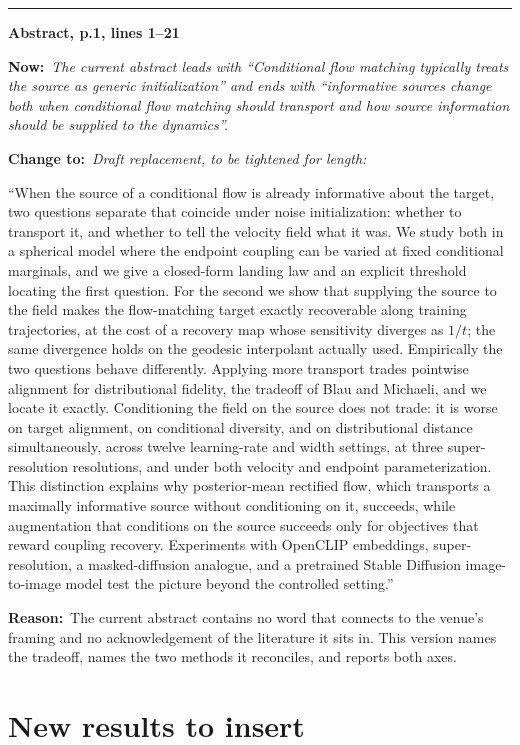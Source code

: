 \documentclass[11pt]{article}
\newcommand{\NEW}[1]{\medskip\noindent\textcolor{hd}{\rule{\textwidth}{0.6pt}}\par
  \noindent\textbf{#1}\par\smallskip}
\newcommand{\OLD}[1]{\noindent\textcolor{cut}{\textbf{Now:}}\ \begingroup\itshape #1\endgroup\par\smallskip}
\newcommand{\FIX}[1]{\noindent\textcolor{put}{\textbf{Change to:}}\ \begingroup\itshape #1\endgroup\par\smallskip}
\newcommand{\NOTE}[1]{\noindent\textbf{Reason:}\ #1\par}
\begin{document}
\NEW{Abstract, p.1, lines 1--21}
\OLD{The current abstract leads with ``Conditional flow matching typically treats the source as
generic initialization'' and ends with ``informative sources change both when conditional flow
matching should transport and how source information should be supplied to the dynamics''.}
\FIX{Draft replacement, to be tightened for length:

``When the source of a conditional flow is already informative about the target, two questions
separate that coincide under noise initialization: whether to transport it, and whether to tell
the velocity field what it was. We study both in a spherical model where the endpoint coupling
can be varied at fixed conditional marginals, and we give a closed-form landing law and an
explicit threshold locating the first question. For the second we show that supplying the source
to the field makes the flow-matching target exactly recoverable along training trajectories, at
the cost of a recovery map whose sensitivity diverges as $1/t$; the same divergence holds on the
geodesic interpolant actually used. Empirically the two questions behave differently. Applying
more transport trades pointwise alignment for distributional fidelity, the tradeoff of Blau and
Michaeli, and we locate it exactly. Conditioning the field on the source does not trade: it is
worse on target alignment, on conditional diversity, and on distributional distance
simultaneously, across twelve learning-rate and width settings, at three super-resolution
resolutions, and under both velocity and endpoint parameterization. This distinction explains why
posterior-mean rectified flow, which transports a maximally informative source without
conditioning on it, succeeds, while augmentation that conditions on the source succeeds only for
objectives that reward coupling recovery. Experiments with OpenCLIP embeddings, super-resolution,
a masked-diffusion analogue, and a pretrained Stable Diffusion image-to-image model test the
picture beyond the controlled setting.''}
\NOTE{The current abstract contains no word that connects to the venue's framing and no
acknowledgement of the literature it sits in. This version names the tradeoff, names the two
methods it reconciles, and reports both axes.}

\section{New results to insert}
\end{document}
